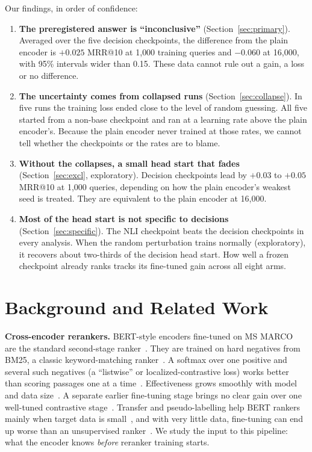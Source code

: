 \documentclass[journal]{IEEEtran}
\makeatletter
\newcommand{\ms}{MRR@10}
\makeatother
\begin{document}
Our findings, in order of confidence:
\begin{enumerate}
\item \textbf{The preregistered answer is ``inconclusive''} (Section~\ref{sec:primary}). Averaged over the five decision checkpoints, the difference from the plain encoder is $+0.025$ \ms{} at 1{,}000 training queries and $-0.060$ at 16{,}000, with 95\% intervals wider than 0.15. These data cannot rule out a gain, a loss or no difference.
\item \textbf{The uncertainty comes from collapsed runs} (Section~\ref{sec:collapse}). In five runs the training loss ended close to the level of random guessing. All five started from a non-base checkpoint and ran at a learning rate above the plain encoder's. Because the plain encoder never trained at those rates, we cannot tell whether the checkpoints or the rates are to blame.
\item \textbf{Without the collapses, a small head start that fades} (Section~\ref{sec:excl}, exploratory). Decision checkpoints lead by $+0.03$ to $+0.05$ \ms{} at 1{,}000 queries, depending on how the plain encoder's weakest seed is treated. They are equivalent to the plain encoder at 16{,}000.
\item \textbf{Most of the head start is not specific to decisions} (Section~\ref{sec:specific}). The NLI checkpoint beats the decision checkpoints in every analysis. When the random perturbation trains normally (exploratory), it recovers about two-thirds of the decision head start. How well a frozen checkpoint already ranks tracks its fine-tuned gain across all eight arms.
\end{enumerate}

\section{Background and Related Work}

\textbf{Cross-encoder rerankers.} BERT-style encoders fine-tuned on MS MARCO~\cite{nguyen2016msmarco} are the standard second-stage ranker~\cite{nogueira2019passage,nogueira2020monot5,lin2021survey}. They are trained on hard negatives from BM25, a classic keyword-matching ranker~\cite{robertson2009bm25}. A softmax over one positive and several such negatives (a ``listwise'' or localized-contrastive loss) works better than scoring passages one at a time~\cite{gao2021rethink}. Effectiveness grows smoothly with model and data size~\cite{seetharaman2026scaling}. A separate earlier fine-tuning stage brings no clear gain over one well-tuned contrastive stage~\cite{pezzuti2025multistage}. Transfer and pseudo-labelling help BERT rankers mainly when target data is small~\cite{mokrii2021transfer}, and with very little data, fine-tuning can end up worse than an unsupervised ranker~\cite{zhang2020littlebit}. We study the input to this pipeline: what the encoder knows \emph{before} reranker training starts.
\end{document}
